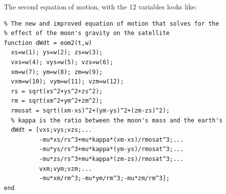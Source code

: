 \documentclass{article}
\begin{document}
\noindent
The second equation of motion, with the 12 variables looks like:
\begin{verbatim}
% The new and improved equation of motion that solves for the                                                                              
% effect of the moon's gravity on the satellite                                                                                            
function dWdt = eom2(t,w)                                                                                                                  
  xs=w(1); ys=w(2); zs=w(3);                                                                                                               
  vxs=w(4); vys=w(5); vzs=w(6);                                                                                                            
  xm=w(7); ym=w(8); zm=w(9);                                                                                                               
  vxm=w(10); vym=w(11); vzm=w(12);                                                                                                         
  rs = sqrt(xs^2+ys^2+zs^2);                                                                                                               
  rm = sqrt(xm^2+ym^2+zm^2);                                                                                                               
  rmosat = sqrt((xm-xs)^2+(ym-ys)^2+(zm-zs)^2);                                                                                            
  % kappa is the ratio between the moon's mass and the earth's                                                                             
  dWdt = [vxs;vys;vzs;...                                                                                                                  
          -mu*xs/rs^3+mu*kappa*(xm-xs)/rmosat^3;...                                                                                        
          -mu*ys/rs^3+mu*kappa*(ym-ys)/rmosat^3;...                                                                                        
          -mu*zs/rs^3+mu*kappa*(zm-zs)/rmosat^3;...                                                                                        
          vxm;vym;vzm;...                                                                                                                  
          -mu*xm/rm^3;-mu*ym/rm^3;-mu*zm/rm^3];                                                                                            
end
\end{verbatim}
\end{document}
